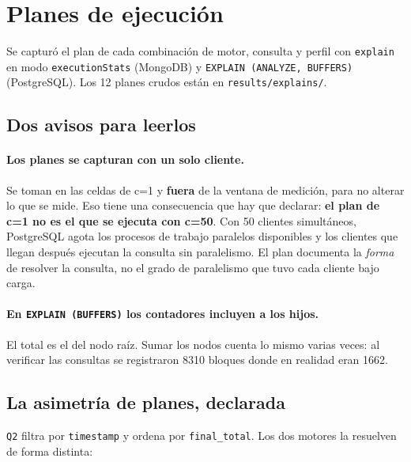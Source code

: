 
\section{Planes de ejecución}
\label{sec:planes}

Se capturó el plan de cada combinación de motor, consulta y perfil con
\texttt{explain} en modo \texttt{executionStats} (MongoDB) y
\texttt{EXPLAIN (ANALYZE, BUFFERS)} (PostgreSQL). Los 12 planes crudos están en
\texttt{results/explains/}.

\subsection{Dos avisos para leerlos}

\paragraph{Los planes se capturan con un solo cliente.}
Se toman en las celdas de \mbox{c=1} y \textbf{fuera} de la ventana de medición,
para no alterar lo que se mide. Eso tiene una consecuencia que hay que declarar:
\textbf{el plan de \mbox{c=1} no es el que se ejecuta con \mbox{c=50}}. Con 50
clientes simultáneos, PostgreSQL agota los procesos de trabajo paralelos
disponibles y los clientes que llegan después ejecutan la consulta sin
paralelismo. El plan documenta la \emph{forma} de resolver la consulta, no el
grado de paralelismo que tuvo cada cliente bajo carga.

\paragraph{En \texttt{EXPLAIN (BUFFERS)} los contadores incluyen a los hijos.}
El total es el del nodo raíz. Sumar los nodos cuenta lo mismo varias veces: al
verificar las consultas se registraron 8310 bloques donde en realidad eran 1662.

\subsection{La asimetría de planes, declarada}
\label{sec:asimetria-planes}

\texttt{Q2} filtra por \texttt{timestamp} y ordena por \texttt{final\_total}. Los
dos motores la resuelven de forma distinta:

